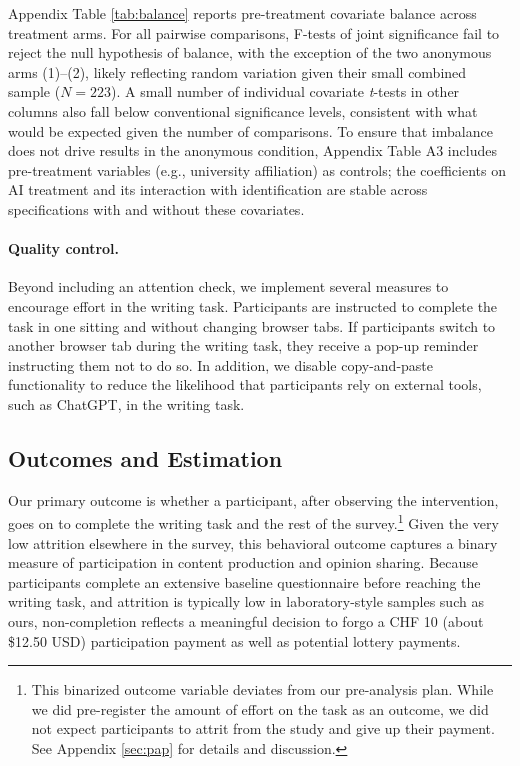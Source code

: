 \documentclass[12pt,notitlepage]{article}
\theoremstyle{plain}
\theoremstyle{plain}
\theoremstyle{definition}
\theoremstyle{definition}
\theoremstyle{assumption}
\theoremstyle{plain}
\theoremstyle{plain}
\theoremstyle{plain}
\theoremstyle{plain}
\theoremstyle{definition}%
\theoremstyle{plain}
\theoremstyle{plain}
\theoremstyle{plain}
\theoremstyle{plain}
\begin{document}
Appendix Table \ref{tab:balance} reports pre-treatment covariate balance across treatment arms. For all pairwise comparisons, F-tests of joint significance fail to reject the null hypothesis of balance, with the exception of the two anonymous arms (1)--(2), likely reflecting random variation given their small combined sample ($N = 223$). A small number of individual covariate \textit{t}-tests in other columns also fall below conventional significance levels, consistent with what would be expected given the number of comparisons.  To ensure that imbalance does not drive results in the anonymous condition, Appendix Table A3 includes pre-treatment variables (e.g., university affiliation) as controls; the coefficients on AI treatment and its interaction with identification are stable across specifications with and without these covariates.




\paragraph*{Quality control. }
Beyond including an attention check, we implement several measures to encourage effort in the writing task. Participants are instructed to complete the task in one sitting and without changing browser tabs. 
If participants switch to another browser tab during the writing task, they receive a pop-up reminder instructing them not to do so. In addition, we disable copy-and-paste functionality to reduce the likelihood that participants rely on external tools, such as ChatGPT, in the writing task. 

\subsection{Outcomes and Estimation}
Our primary outcome is whether a participant, after observing the intervention, goes on to complete the writing task and the rest of the survey.\footnote{This binarized outcome variable deviates from our pre-analysis plan. While we did pre-register the amount of effort on the task as an outcome, we did not expect participants to attrit from the study and give up their payment. See Appendix \ref{sec:pap} for details and discussion.} Given the very low attrition elsewhere in the survey, this behavioral outcome captures a binary measure of participation in content production and opinion sharing. Because participants complete an extensive baseline questionnaire before reaching the writing task, and attrition is typically low in laboratory-style samples such as ours, non-completion reflects a meaningful decision to forgo a CHF 10 (about \$12.50 USD) participation payment as well as potential lottery payments.
\end{document}
